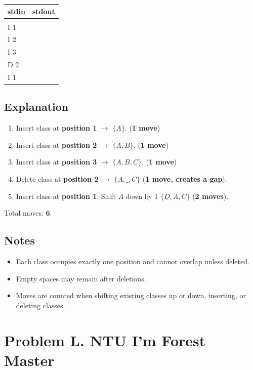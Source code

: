 \documentclass[12pt,a4paper]{article}
\begin{document}
\begin{table}[h]
  \centering
  \begin{tabularx}{\textwidth}{|>{\ttfamily}X|>{\ttfamily}X|}
  \hline
  \textbf{stdin} & \textbf{stdout} \\
  \hline
  5 & 6 \\
  I 1 &  \\
  I 2 & \\
  I 3 & \\
  D 2 &\\
  I 1 & \\
  \hline
 \end{tabularx}
\end{table}

\subsection*{\fontsize{16}{12}Explanation}
\begin{enumerate}
    \item Insert class at \textbf{position 1} $\rightarrow$ \(\{\underline{A}\}\). (\textbf{1 move})
    \item Insert class at \textbf{position 2} $\rightarrow$ \(\{A, \underline{B}\}\). (\textbf{1 move})
    \item Insert class at \textbf{position 3} $\rightarrow$ \(\{A, B, \underline{C}\}\). (\textbf{1 move})
    \item Delete class at \textbf{position 2} $\rightarrow$ \(\{A, \_, C\}\) (\textbf{1 move, creates a gap}).
    \item Insert class at \textbf{position 1}: Shift \( A \) down by 1 \(\{\underline{D}, A, C\}\) (\textbf{2 moves}).
\end{enumerate}
Total moves: \textbf{6}.

\subsection*{\fontsize{16}{12}Notes}
\begin{itemize}
    \item Each class occupies exactly one position and cannot overlap unless deleted.
    \item Empty spaces may remain after deletions.
    \item Moves are counted when shifting existing classes up or down, inserting, or deleting classes.
\end{itemize}

\newpage
\section*{\fontsize{18}{12}Problem L. NTU I'm Forest Master}
\end{document}
